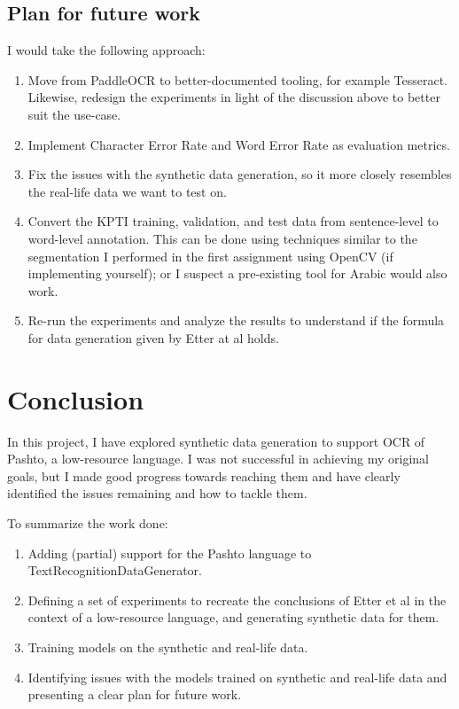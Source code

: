 \documentclass[twocolumn,11pt]{extarticle}
\begin{document}
\subsection{Plan for future work}
I would take the following approach: 
\begin{enumerate}
    \item Move from PaddleOCR to better-documented tooling, for example Tesseract. Likewise, redesign the experiments in light of the discussion above to better suit the use-case. 
    \item Implement Character Error Rate and Word Error Rate as evaluation metrics. 
    \item Fix the issues with the synthetic data generation, so it more closely resembles the real-life data we want to test on.
    \item Convert the KPTI training, validation, and test data from sentence-level to word-level annotation. This can be done using techniques similar to the segmentation I performed in the first assignment using OpenCV (if implementing yourself); or I suspect a pre-existing tool for Arabic would also work. 
    \item Re-run the experiments and analyze the results to understand if the formula for data generation given by Etter at al holds. 
\end{enumerate}
\section{Conclusion}
In this project, I have explored synthetic data generation to support OCR of Pashto, a low-resource language. I was not successful in achieving my original goals, but I made good progress towards reaching them and have clearly identified the issues remaining and how to tackle them. 

\noindent To summarize the work done: 
\begin{enumerate}
    \item Adding (partial) support for the Pashto language to TextRecognitionDataGenerator.
    \item Defining a set of experiments to recreate the conclusions of Etter et al in the context of a low-resource language, and generating synthetic data for them.
    \item Training models on the synthetic and real-life data.
    \item Identifying issues with the models trained on synthetic and real-life data and presenting a clear plan for future work.
\end{enumerate}
\end{document}
